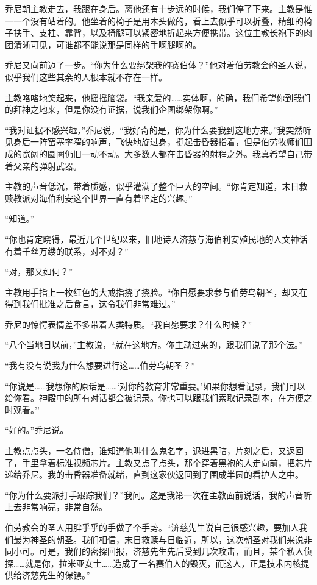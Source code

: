 \documentclass[AutoFakeBold=true]{book}
\begin{document}
乔尼朝主教走去，我跟在身后。离他还有十步远的时候，我们停了下来。主教是惟一一个没有站着的。他坐着的椅子是用木头做的，看上去似乎可以折叠，精细的椅子扶手、支柱、靠背，以及椅腿可以紧密地折起来方便携带。这位主教长袍下的肉团清晰可见，可谁都不能说那是同样的手啊腿啊的。

乔尼又向前迈了一步。``你为什么要绑架我的赛伯体？''他对着伯劳教会的圣人说，似乎我们这些其余的人根本就不存在一样。

主教咯咯地笑起来，他摇摇脑袋。``我亲爱的……实体啊，的确，我们希望你到我们的拜神之地来，但是你没有证据，说我们企图绑架你啊。''

``我对证据不感兴趣，''乔尼说，``我好奇的是，你为什么要我到这地方来。''我突然听见身后一阵窑塞率窄的响声，飞快地旋过身，挺起击昏器指着，但是伯劳牧师们围成的宽阔的圆圈仍旧一动不动。大多数人都在击昏器的射程之外。我真希望自己带着父亲的弹射武器。

主教的声音低沉，带着质感，似乎灌满了整个巨大的空间。``你肯定知道，末日救赎教派对海伯利安这个世界一直有着坚定的兴趣。''

``知道。''

``你也肯定晓得，最近几个世纪以来，旧地诗人济慈与海伯利安殖民地的人文神话有着千丝万缕的联系，对不对？''

``对，那又如何？''

主教用手指上一枚红色的大戒指挠了挠脸。``你自愿要求参与伯劳鸟朝圣，却又在得到我们批准之后食言，这令我们非常难过。''

乔尼的惊愕表情差不多带着人类特质。``我自愿要求？什么时候？''

``八个当地日以前，''主教说，``就在这地方。你主动过来的，跟我们说了那个法。''

``我有没有说我为什么想要进行这……伯劳鸟朝圣？''

``你说是……我想你的原话是……`对你的教育非常重要。'如果你想看记录，我们可以给你看。神殿中的所有对话都会被记录。你也可以跟我们索取记录副本，在方便之时观看。''

``好的。''乔尼说。

主教点点头，一名侍僧，谁知道他叫什么鬼名字，退进黑暗，片刻之后，又返回了，手里拿着标准视频芯片。主教又点了点头，那个穿着黑袍的人走向前，把芯片递给乔尼。我的击昏器准备就绪，直到这家伙返回到了围成半圆的看护人之中。

``你为什么要派打手跟踪我们？''我问。这是我第一次在主教面前说话，我的声音听上去非常响亮，非常自然。

伯劳教会的圣人用胖乎乎的手做了个手势。``济慈先生说自己很感兴趣，要加人我们最为神圣的朝圣。我们相信，末日救赎与日临近，所以，这次朝圣对我们来说非同小可。可是，我们的密探回报，济慈先生先后受到几次攻击，而且，某个私人侦探……就是你，拉米亚女士……造成了一名赛伯人的毁灭，而这人，正是技术内核提供给济慈先生的保镖。''
\end{document}
